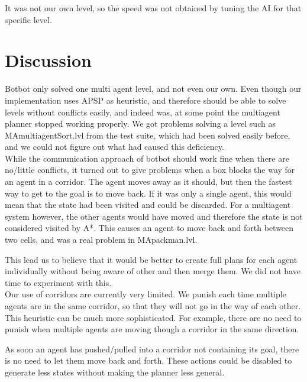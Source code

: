 \documentclass[letterpaper]{article}
\begin{document}
It was not our own level, so the speed was not obtained by tuning the AI for that
specific level.

\section{Discussion}
Botbot only solved one multi agent level, and not even our own. Even though our
implementation uses APSP as heuristic, and therefore should be able to solve
levels without conflicts easily, and indeed was, at some point the multiagent
planner stopped working properly. We got problems solving a level such as MAmultiagentSort.lvl
from the test suite, which had been solved easily before, and we could not
figure out what had caused this deficiency.\\

While the communication approach of botbot should work fine when there are
no/little conflicts, it turned out to give problems when a box blocks the way for
an agent in a corridor. The agent moves away as it should, but then the fastest
way to get to the goal is to move back. If it was only a single agent, this would
mean that the state had been visited and could be discarded. For a multiagent system
however, the other agents would have moved and therefore the state is not considered
visited by A*. This causes an agent to move back and forth between two cells, and
was a real problem in MApackman.lvl.

This lead us to believe that it would be better to create full plans for each agent
individually without being aware of other and then merge them. We did not have time
to experiment with this.\\


Our use of corridors are currently very limited. We punish each time multiple agents
are in the same corridor, so that they will not go in the way of each other. This
heuristic can be much more sophisticated. For example, there are no need to punish
when multiple agents are moving though a corridor in the same direction.

As soon an agent has pushed/pulled into a corridor not containing its goal, there
is no need to let them move back and forth. These actions could be disabled to
generate less states without making the planner less general.\\
\end{document}
